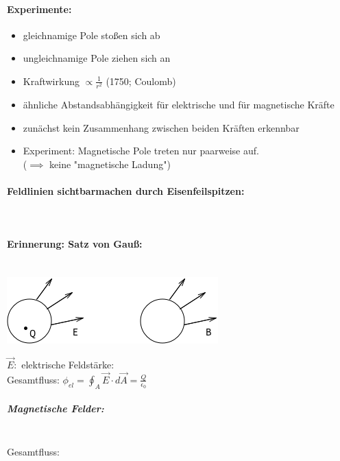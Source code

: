 \paragraph{Experimente:}
\begin{itemize}
  \item gleichnamige Pole stoßen sich ab
  \item ungleichnamige Pole ziehen sich an\\
  \item Kraftwirkung $\propto\frac{1}{r^2}$ (1750; Coulomb)
  \item ähnliche Abstandsabhängigkeit für elektrische und für magnetische Kräfte
  \item zunächst kein Zusammenhang zwischen beiden Kräften erkennbar
  \item Experiment: Magnetische Pole treten nur paarweise auf. \\ ($\implies$ keine "magnetische Ladung")
\end{itemize}

\paragraph{Feldlinien sichtbarmachen durch Eisenfeilspitzen:}\leavevmode \\


\paragraph{Erinnerung: Satz von Gauß:}\leavevmode \\
\includegraphics{skizzen/16/16_0B01}

$\vec{E}:$ elektrische Feldstärke:\\
Gesamtfluss: $\phi_{el}=\oint_A \vec{E}\cdot d\vec{A}=\frac{Q}{\epsilon_0}$\\

\subparagraph{Magnetische Felder:}\leavevmode \\

Gesamtfluss: 
  
